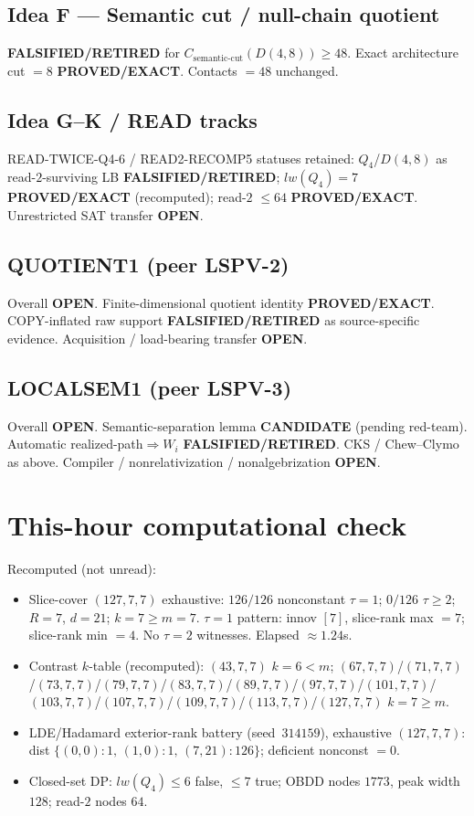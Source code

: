 \documentclass[11pt]{article}
\begin{document}
\subsection*{Idea F --- Semantic cut / null-chain quotient}
\textbf{FALSIFIED/RETIRED} for $C_{\mathrm{semantic\textrm{-}cut}}(D(4,8))\ge48$.
Exact architecture cut $=8$ \textbf{PROVED/EXACT}. Contacts $=48$ unchanged.

\subsection*{Idea G--K / READ tracks}
READ-TWICE-Q4-6 / READ2-RECOMP5 statuses retained: $Q_4$/$D(4,8)$ as read-$2$-surviving LB
\textbf{FALSIFIED/RETIRED}; $lw(Q_4)=7$ \textbf{PROVED/EXACT} (recomputed); read-$2$ $\le64$
\textbf{PROVED/EXACT}. Unrestricted SAT transfer \textbf{OPEN}.

\subsection*{QUOTIENT1 (peer LSPV-2)}
Overall \textbf{OPEN}. Finite-dimensional quotient identity \textbf{PROVED/EXACT}.
COPY-inflated raw support \textbf{FALSIFIED/RETIRED} as source-specific evidence.
Acquisition / load-bearing transfer \textbf{OPEN}.

\subsection*{LOCALSEM1 (peer LSPV-3)}
Overall \textbf{OPEN}. Semantic-separation lemma \textbf{CANDIDATE} (pending red-team).
Automatic realized-path$\Rightarrow W_i$ \textbf{FALSIFIED/RETIRED}.
CKS / Chew--Clymo as above. Compiler / nonrelativization / nonalgebrization \textbf{OPEN}.

\section*{This-hour computational check}
Recomputed (not unread):
\begin{itemize}
\item Slice-cover $(127,7,7)$ exhaustive: $126/126$ nonconstant $\tau{=}1$;
  $0/126$ $\tau{\ge}2$; $R{=}7$, $d{=}21$; $k{=}7{\ge}m{=}7$.
  $\tau{=}1$ pattern: innov $[7]$, slice-rank max $=7$; slice-rank min $=4$.
  No $\tau{=}2$ witnesses. Elapsed $\approx1.24$s.
\item Contrast $k$-table (recomputed): $(43,7,7)$ $k{=}6{<}m$;
  $(67,7,7)$/$(71,7,7)$/$(73,7,7)$/$(79,7,7)$/$(83,7,7)$/$(89,7,7)$/$(97,7,7)$/$(101,7,7)$/$(103,7,7)$/$(107,7,7)$/$(109,7,7)$/$(113,7,7)$/$(127,7,7)$ $k{=}7{\ge}m$.
\item LDE/Hadamard exterior-rank battery (seed~$314159$), exhaustive $(127,7,7)$:
  dist $\{(0,0){:}1,\,(1,0){:}1,\,(7,21){:}126\}$; deficient nonconst $=0$.
\item Closed-set DP: $lw(Q_4)\le6$ false, $\le7$ true; OBDD nodes $1773$, peak width $128$;
  read-$2$ nodes $64$.
\end{itemize}
\end{document}
